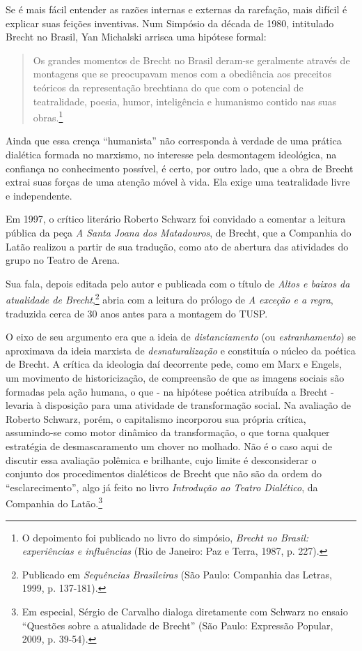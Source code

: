 Se é mais fácil entender as razões internas e externas da rarefação,
mais difícil é explicar suas feições inventivas. Num Simpósio da década
de 1980, intitulado Brecht no Brasil, Yan Michalski arrisca uma hipótese
formal:

\begin{quote}
Os grandes momentos de Brecht no Brasil deram-se geralmente através de
montagens que se preocupavam menos com a obediência aos preceitos
teóricos da representação brechtiana do que com o potencial de
teatralidade, poesia, humor, inteligência e humanismo contido nas suas
obras.\footnote{O depoimento foi publicado no livro do simpósio,
  \textit{Brecht no Brasil: experiências e influências} (Rio de Janeiro:
  Paz e Terra, 1987, p. 227).}
\end{quote}

Ainda que essa crença “humanista” não corresponda à verdade de uma
prática dialética formada no marxismo, no interesse pela desmontagem
ideológica, na confiança no conhecimento possível, é certo, por outro
lado, que a obra de Brecht extrai suas forças de uma atenção móvel à
vida. Ela exige uma teatralidade livre e independente.

Em 1997, o crítico literário Roberto Schwarz foi convidado a comentar a
leitura pública da peça \textit{A Santa Joana dos Matadouros}, de Brecht,
que a Companhia do Latão realizou a partir de sua tradução, como ato de
abertura das atividades do grupo no Teatro de Arena.

Sua fala, depois editada pelo autor e publicada com o título de
\textit{Altos e baixos da atualidade de Brecht},\footnote{Publicado em
  \textit{Sequências Brasileiras} (São Paulo: Companhia das Letras, 1999,
  p. 137-181).} abria com a leitura do prólogo de \textit{A exceção e a
regra}, traduzida cerca de 30 anos antes para a montagem do TUSP.

O eixo de seu argumento era que a ideia de \textit{distanciamento} (ou
\textit{estranhamento}) se aproximava da ideia marxista de
\textit{desnaturalização} e constituía o núcleo da poética de Brecht. A
crítica da ideologia daí decorrente pede, como em Marx e Engels, um
movimento de historicização, de compreensão de que as imagens sociais
são formadas pela ação humana, o que - na hipótese poética atribuída a
Brecht - levaria à disposição para uma atividade de transformação
social. Na avaliação de Roberto Schwarz, porém, o capitalismo incorporou
sua própria crítica, assumindo-se como motor dinâmico da transformação,
o que torna qualquer estratégia de desmascaramento um chover no molhado.
Não é o caso aqui de discutir essa avaliação polêmica e brilhante, cujo
limite é desconsiderar o conjunto dos procedimentos dialéticos de Brecht
que não são da ordem do “esclarecimento”, algo já feito no livro
\textit{Introdução ao Teatro Dialético}, da Companhia do Latão.\footnote{Em
  especial, Sérgio de Carvalho dialoga diretamente com Schwarz no ensaio
  “Questões sobre a atualidade de Brecht” (São Paulo: Expressão Popular,
  2009, p. 39-54).}

